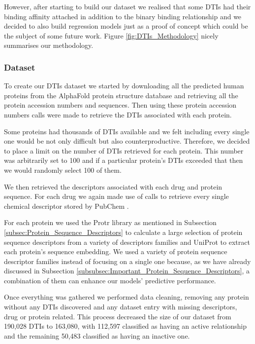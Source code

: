 However, after starting to build our dataset we realised that some DTIs had their binding affinity attached in addition to the binary binding relationship and we decided to also build regression models just as a proof of concept which could be the subject of some future work. Figure \ref{fig:DTIs_Methodology} nicely summarises our methodology.

\subsubsection{Dataset}

To create our DTIs dataset we started by downloading all the predicted human proteins from the AlphaFold protein structure database \citep{Jumper2021, Varadi2022} and retrieving all the protein accession numbers and sequences. Then using these protein accession numbers \citet{PubChemAPI} calls were made to retrieve the DTIs associated with each protein.

Some proteins had thousands of DTIs available and we felt including every single one would be not only difficult but also counterproductive. Therefore, we decided to place a limit on the number of DTIs retrieved for each protein. This number was arbitrarily set to 100 and if a particular protein's DTIs exceeded that then we would randomly select 100 of them.

We then retrieved the descriptors associated with each drug and protein sequence. For each drug we again made use of \citet{PubChemAPI} calls to retrieve every single chemical descriptor stored by PubChem \citep{PubChem}. 

For each protein we used the Protr \citep{ProtR_Paper} library as mentioned in Subsection \ref{subsec:Protein_Sequence_Descriptors} to calculate a large selection of protein sequence descriptors from a variety of descriptors families and UniProt \citep{UniProt_Paper} to extract each protein's sequence embedding. We used a variety of protein sequence descriptor families instead of focusing on a single one because, as we have already discussed in Subsection \ref{subsubsec:Important_Protein_Sequence_Descriptors}, a combination of them can enhance our models' predictive performance.

Once everything was gathered we performed data cleaning, removing any protein without any DTIs discovered and any dataset entry with missing descriptors, drug or protein related. This process decreased the size of our dataset from 190,028 DTIs to 163,080, with 112,597 classified as having an active relationship and the remaining 50,483 classified as having an inactive one. 

